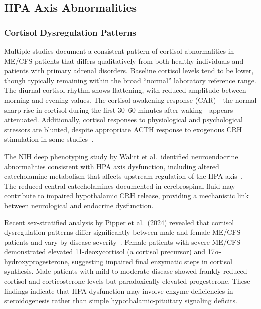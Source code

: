 \subsection{HPA Axis Abnormalities}

\subsubsection{Cortisol Dysregulation Patterns}

\begin{observation}
\label{obs:cortisol-pattern}
Multiple studies document a consistent pattern of cortisol abnormalities in ME/CFS patients that differs qualitatively from both healthy individuals and patients with primary adrenal disorders. Baseline cortisol levels tend to be lower, though typically remaining within the broad ``normal'' laboratory reference range. The diurnal cortisol rhythm shows flattening, with reduced amplitude between morning and evening values. The cortisol awakening response (CAR)---the normal sharp rise in cortisol during the first 30--60 minutes after waking---appears attenuated. Additionally, cortisol responses to physiological and psychological stressors are blunted, despite appropriate ACTH response to exogenous CRH stimulation in some studies~\cite{pipper2024steroid}.
\end{observation}

The NIH deep phenotyping study by Walitt et al.\ identified neuroendocrine abnormalities consistent with HPA axis dysfunction, including altered catecholamine metabolism that affects upstream regulation of the HPA axis~\cite{walitt2024deep}. The reduced central catecholamines documented in cerebrospinal fluid may contribute to impaired hypothalamic CRH release, providing a mechanistic link between neurological and endocrine dysfunction.

Recent sex-stratified analysis by Pipper et al.\ (2024) revealed that cortisol dysregulation patterns differ significantly between male and female ME/CFS patients and vary by disease severity~\cite{pipper2024steroid}. Female patients with severe ME/CFS demonstrated elevated 11-deoxycortisol (a cortisol precursor) and 17$\alpha$-hydroxyprogesterone, suggesting impaired final enzymatic steps in cortisol synthesis. Male patients with mild to moderate disease showed frankly reduced cortisol and corticosterone levels but paradoxically elevated progesterone. These findings indicate that HPA dysfunction may involve enzyme deficiencies in steroidogenesis rather than simple hypothalamic-pituitary signaling deficits.

